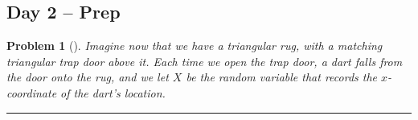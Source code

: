 \documentclass[letterpaper,oneside]{book}%
\theoremstyle{plain}
\theoremstyle{box}
\theoremstyle{problem}
\newtheorem{problemnum}{Problem}[chapter]
\newenvironment{problem}[1][]{\begin{problemnum}[#1]}{\end{problemnum}\nopagebreak\hrule\bigskip}
\begin{document}
\subsection{Day 2 -- Prep}
\begin{problem}
\label{D2_TriangleRug}
Imagine now that we have a triangular rug, with a matching triangular trap door above it. Each time we open the trap door, a dart falls from the door onto the rug, and we let $X$ be the random variable that records the $x$-coordinate of the dart's location. 
 \begin{center}
 \end{center}
 
 \begin{enumerate}


\end{enumerate}
\end{problem}
\end{document}
